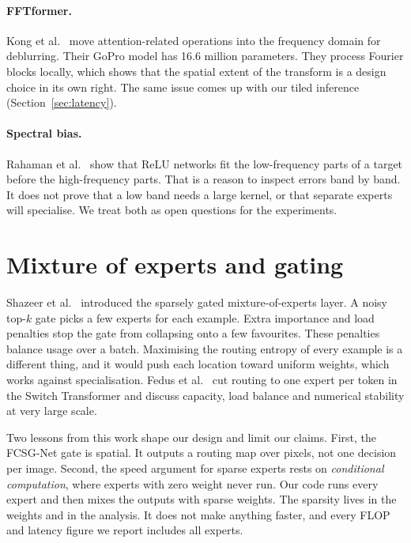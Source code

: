 \documentclass[12pt,a4paper,oneside]{NITR}
\newcommand{\fcsg}{FCSG-Net}
\begin{document}
\paragraph{FFTformer.} Kong et al.\ \cite{kong2023fftformer} move
attention-related operations into the frequency domain for deblurring. Their
GoPro model has 16.6 million parameters. They process Fourier blocks locally,
which shows that the spatial extent of the transform is a design choice in
its own right. The same issue comes up with our tiled inference
(Section~\ref{sec:latency}).

\paragraph{Spectral bias.} Rahaman et al.\ \cite{rahaman2019spectral} show
that ReLU networks fit the low-frequency parts of a target before the
high-frequency parts. That is a reason to inspect errors band by band. It
does not prove that a low band needs a large kernel, or that separate experts
will specialise. We treat both as open questions for the experiments.

\section{Mixture of experts and gating}\label{sec:lit-moe}

Shazeer et al.\ \cite{shazeer2017moe} introduced the sparsely gated
mixture-of-experts layer. A noisy top-$k$ gate picks a few experts for each
example. Extra importance and load penalties stop the gate from collapsing
onto a few favourites. These penalties balance usage over a batch. Maximising
the routing entropy of every example is a different thing, and it would push
each location toward uniform weights, which works against specialisation.
Fedus et al.\ \cite{fedus2022switch} cut routing to one expert per token in
the Switch Transformer and discuss capacity, load balance and numerical
stability at very large scale.

Two lessons from this work shape our design and limit our claims. First, the
\fcsg{} gate is spatial. It outputs a routing map over pixels, not one
decision per image. Second, the speed argument for sparse experts rests on
\emph{conditional computation}, where experts with zero weight never run. Our
code runs every expert and then mixes the outputs with sparse weights. The
sparsity lives in the weights and in the analysis. It does not make anything
faster, and every FLOP and latency figure we report includes all experts.
\end{document}
